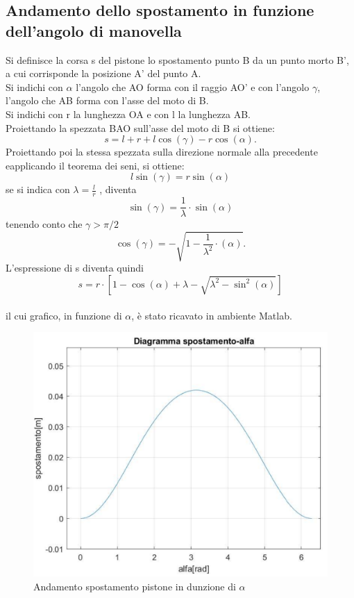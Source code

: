\subsection{Andamento dello spostamento in funzione dell'angolo di manovella}
Si definisce la corsa s del pistone lo spostamento punto B da un punto morto B’, a cui corrisponde la posizione A’ del punto A.\\
Si indichi con $\alpha$ l’angolo che AO forma con il raggio AO’ e con l’angolo $\gamma$, l’angolo che AB forma con l’asse del moto di B. \\
Si indichi con r la lunghezza OA e con l la lunghezza AB.\\
Proiettando la spezzata BAO sull’asse del moto di B si ottiene:
\begin{equation}
    s=l+r+l\cos\left(\gamma\right)-r\cos\left(\alpha\right).
\end{equation}
Proiettando poi la stessa spezzata sulla direzione normale alla precedente eapplicando il teorema dei seni, si ottiene:
\begin{equation}
    l\sin\left(\gamma\right)=r\sin\left(\alpha\right)
\end{equation}
se si indica con $\lambda=\frac{l}{r}$ , diventa 
\begin{equation}
    \sin\left(\gamma\right)=\frac{1}{\lambda}\cdot\sin\left(\alpha\right)
\end{equation}
tenendo conto che $\gamma>\pi/2$
\begin{equation}
    \cos\left(\gamma\right)=-\sqrt{1-\frac{1}{\lambda^2}\cdot\left(\alpha\right)}.
\end{equation}
L’espressione di s diventa quindi 
\begin{equation}
    s=r\cdot\left[1-\cos\left(\alpha\right)+\lambda-\sqrt{\lambda^2-\sin^2\left(\alpha\right)}\right]
    \label{spostamento}
\end{equation}
\\
il cui grafico, in funzione di $\alpha$, è stato ricavato in ambiente Matlab.
\begin{figure}[h]
    \centering
    \includegraphics[scale=0.5]{Immagini/GraficoSpostamento.png}
    \caption{Andamento spostamento pistone in dunzione di $\alpha$}
    \label{fig:GraficoSpostamento}
\end{figure}
